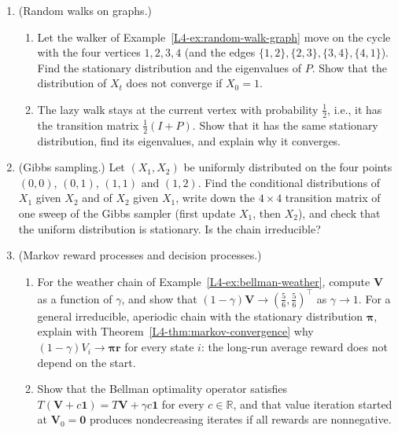 \begin{enumerate}[leftmargin=*]
    Draw its transition graph, compute $P(X_2 = 3 \mid X_0 = 1)$, and find the stationary distribution. Is the chain irreducible and aperiodic? In the long run, what fraction of the time does it spend in state $1$?
    \item (Random walks on graphs.)
    \begin{enumerate}[label=(\alph*)]
        \item Let the walker of Example~\ref{L4-ex:random-walk-graph} move on the cycle with the four vertices $1, 2, 3, 4$ (and the edges $\{1, 2\}, \{2, 3\}, \{3, 4\}, \{4, 1\}$). Find the stationary distribution and the eigenvalues of $P$. Show that the distribution of $X_t$ does not converge if $X_0 = 1$.
        \item The lazy walk stays at the current vertex with probability $\frac{1}{2}$, i.e., it has the transition matrix $\frac{1}{2}(I + P)$. Show that it has the same stationary distribution, find its eigenvalues, and explain why it converges.
    \end{enumerate}
    \item (Gibbs sampling.) Let $(X_1, X_2)$ be uniformly distributed on the four points $(0, 0)$, $(0, 1)$, $(1, 1)$ and $(1, 2)$. Find the conditional distributions of $X_1$ given $X_2$ and of $X_2$ given $X_1$, write down the $4 \times 4$ transition matrix of one sweep of the Gibbs sampler (first update $X_1$, then $X_2$), and check that the uniform distribution is stationary. Is the chain irreducible?
    \item\label{L4-ex4:bellman-limit} \homework{} (Markov reward processes and decision processes.)
    \begin{enumerate}[label=(\alph*)]
        \item For the weather chain of Example~\ref{L4-ex:bellman-weather}, compute $\mathbf{V}$ as a function of $\gamma$, and show that $(1 - \gamma)\mathbf{V} \to (\frac{5}{6}, \frac{5}{6})^\top$ as $\gamma \to 1$. For a general irreducible, aperiodic chain with the stationary distribution $\boldsymbol{\pi}$, explain with Theorem~\ref{L4-thm:markov-convergence} why $(1 - \gamma)V_i \to \boldsymbol{\pi}\mathbf{r}$ for every state $i$: the long-run average reward does not depend on the start.
        \item Show that the Bellman optimality operator satisfies $T(\mathbf{V} + c\mathbf{1}) = T\mathbf{V} + \gamma c\mathbf{1}$ for every $c \in \mathbb{R}$, and that value iteration started at $\mathbf{V}_0 = \mathbf{0}$ produces nondecreasing iterates if all rewards are nonnegative.

\end{enumerate}
\end{enumerate}
